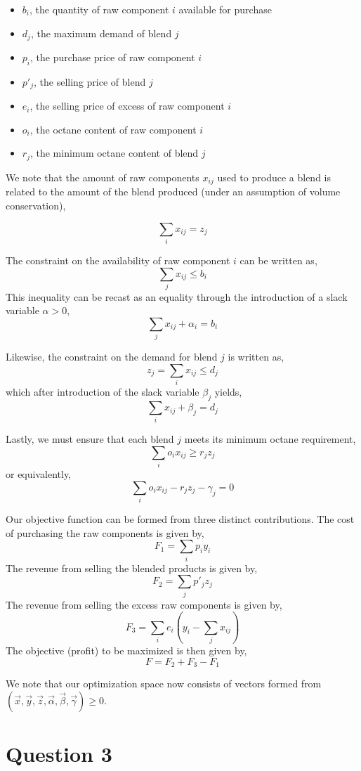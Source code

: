 \documentclass{article}
\begin{document}
\begin{itemize}
\item $b_i$, the quantity of raw component $i$ available for purchase
\item $d_j$, the maximum demand of blend $j$
\item $p_i$, the purchase price of raw component $i$
\item $p'_j$, the selling price of blend $j$
\item $e_i$, the selling price of excess of raw component $i$
\item $o_i$, the octane content of raw component $i$
\item $r_j$, the minimum octane content of blend $j$
\end{itemize}

We note that the amount of raw components $x_{ij}$ used to produce a
blend is related to the amount of the blend produced (under an
assumption of volume conservation),

\[ \sum_i x_{ij} = z_j \tag{C1} \]

The constraint on the availability of raw component $i$ can be written
as,
\[ \sum_j x_{ij} \le b_i \]
This inequality can be recast as an equality through the introduction
of a slack variable $\alpha > 0$,
\[ \sum_j x_{ij} + \alpha_i = b_i \tag{C2} \]

Likewise, the constraint on the demand for blend $j$ is written as,
\[ z_j = \sum_i x_{ij} \le d_j \]
which after introduction of the slack variable $\beta_j$ yields,
\[ \sum_i x_{ij} + \beta_j = d_j \tag{C3} \]

Lastly, we must ensure that each blend $j$ meets its minimum octane requirement,
\[ \sum_i o_i x_{ij} \ge r_j z_j \]
or equivalently,
\[ \sum_i o_i x_{ij} - r_j z_j - \gamma_j = 0 \tag{C4} \]

Our objective function can be formed from three distinct contributions.
The cost of purchasing the raw components is given by,
\[ F_1 = \sum_i p_i y_i \]
The revenue from selling the blended products is given by,
\[ F_2 = \sum_j p'_j z_j \]
The revenue from selling the excess raw components is given by,
\[ F_3 = \sum_i e_i \left(y_i - \sum_j x_{ij}\right) \]
The objective (profit) to be maximized is then given by,
\[ F = F_2 + F_3 - F_1 \tag{Obj} \]

We note that our optimization space now consists of vectors formed from
$(\vec x, \vec y, \vec z, \vec\alpha, \vec\beta, \vec\gamma) \ge 0$.

\section{Question 3}
\end{document}
